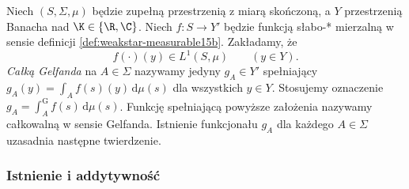 \begin{definicja}
\label{def:gelfand15b}
Niech $(S,\Sigma,\mu)$ będzie zupełną przestrzenią z miarą
skończoną, a $Y$ przestrzenią Banacha nad $\K\in\{\R,\C\}$.
Niech $f:S\to Y'$ będzie funkcją słabo-* mierzalną
w sensie definicji \ref{def:weakstar-measurable15b}.
Zakładamy, że
\[
 f(\cdot)(y)\in L^1(S,\mu)\qquad(y\in Y).
\] \emph{Całką Gelfanda} na $A\in\Sigma$ nazywamy
jedyny $g_A\in Y'$ spełniający
$g_A(y)=\int_Af(s)(y)\,\mathrm d\mu(s)$ dla wszystkich
$y\in Y$. Stosujemy oznaczenie
$g_A=\int_A^{\mathrm G}f(s)\,\mathrm d\mu(s)$.
Funkcję spełniającą powyższe założenia nazywamy całkowalną
w sensie Gelfanda. Istnienie funkcjonału $g_A$ dla każdego
$A\in\Sigma$ uzasadnia następne twierdzenie.
\end{definicja}

\subsubsection{Istnienie i addytywność}

